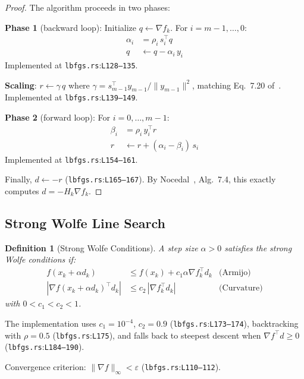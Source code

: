 \documentclass[11pt,a4paper]{article}
\newtheorem{definition}[theorem]{Definition}
\theoremstyle{remark}
\newcommand{\coderef}[2]{\texttt{#1}:\texttt{L#2}}
\begin{document}
\begin{proof}
The algorithm proceeds in two phases:

\textbf{Phase 1} (backward loop): Initialize $q \leftarrow \nabla f_k$.
For $i = m{-}1, \ldots, 0$:
\begin{align}
  \alpha_i &= \rho_i\, s_i^\top q  \label{eq:lbfgs-alpha}\\
  q &\leftarrow q - \alpha_i\, y_i \label{eq:lbfgs-q-update}
\end{align}
Implemented at \coderef{lbfgs.rs}{128--135}.

\textbf{Scaling}: $r \leftarrow \gamma\, q$ where
$\gamma = s_{m-1}^\top y_{m-1} / \|y_{m-1}\|^2$, matching Eq.~7.20
of~\cite{nocedal2006}.  Implemented at \coderef{lbfgs.rs}{139--149}.

\textbf{Phase 2} (forward loop): For $i = 0, \ldots, m{-}1$:
\begin{align}
  \beta_i &= \rho_i\, y_i^\top r \\
  r &\leftarrow r + (\alpha_i - \beta_i)\, s_i
\end{align}
Implemented at \coderef{lbfgs.rs}{154--161}.

Finally, $d \leftarrow -r$ (\coderef{lbfgs.rs}{165--167}).  By
Nocedal~\cite{nocedal2006}, Alg.~7.4, this exactly computes
$d = -H_k \nabla f_k$.
\end{proof}

\subsection{Strong Wolfe Line Search}

\begin{definition}[Strong Wolfe Conditions]
A step size $\alpha > 0$ satisfies the strong Wolfe conditions if:
\begin{align}
  f(x_k + \alpha d_k) &\leq f(x_k) + c_1 \alpha \nabla f_k^\top d_k
    & \text{(Armijo)} \label{eq:armijo}\\
  |\nabla f(x_k + \alpha d_k)^\top d_k| &\leq c_2\, |\nabla f_k^\top d_k|
    & \text{(Curvature)} \label{eq:wolfe}
\end{align}
with $0 < c_1 < c_2 < 1$.
\end{definition}

The implementation uses $c_1 = 10^{-4}$, $c_2 = 0.9$ (\coderef{lbfgs.rs}{173--174}),
backtracking with $\rho = 0.5$ (\coderef{lbfgs.rs}{175}), and falls back to
steepest descent when $\nabla f^\top d \geq 0$ (\coderef{lbfgs.rs}{184--190}).

Convergence criterion: $\|\nabla f\|_\infty < \varepsilon$
(\coderef{lbfgs.rs}{110--112}).
\end{document}
